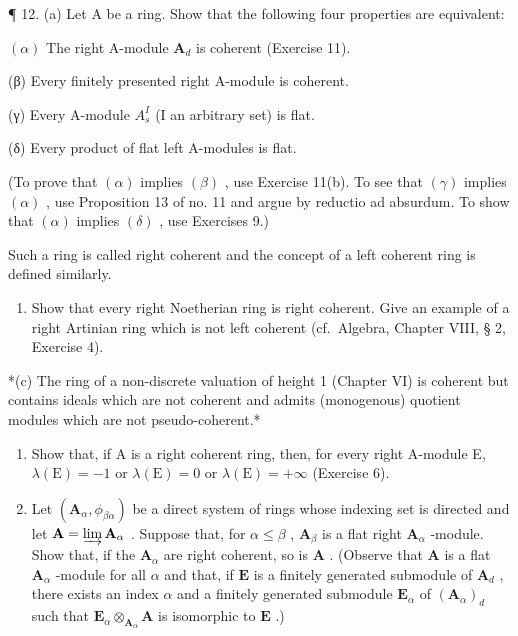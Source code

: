 ¶ 12. (a) Let A be a ring. Show that the following four properties are equivalent:

\((\alpha)\) The right A-module \(\mathbf{A}_d\) is coherent (Exercise 11).

(β) Every finitely presented right A-module is coherent.

(γ) Every A-module \(A_{s}^{I}\) (I an arbitrary set) is flat.

(δ) Every product of flat left A-modules is flat.

(To prove that \((\alpha)\) implies \((\beta)\) , use Exercise 11(b). To see that \((\gamma)\) implies \((\alpha)\) , use Proposition 13 of no. 11 and argue by reductio ad absurdum. To show that \((\alpha)\) implies \((\delta)\) , use Exercises 9.)

Such a ring is called right coherent and the concept of a left coherent ring is defined similarly.

\begin{enumerate}
\def\labelenumi{(\alph{enumi})}
\setcounter{enumi}{1}
\tightlist
\item
  Show that every right Noetherian ring is right coherent. Give an example of a right Artinian ring which is not left coherent (cf.~Algebra, Chapter VIII, § 2, Exercise 4).
\end{enumerate}

*(c) The ring of a non-discrete valuation of height 1 (Chapter VI) is coherent but contains ideals which are not coherent and admits (monogenous) quotient modules which are not pseudo-coherent.*

\begin{enumerate}
\def\labelenumi{(\alph{enumi})}
\setcounter{enumi}{3}
\item
  Show that, if A is a right coherent ring, then, for every right A-module E, \(\lambda(\mathrm{E}) = -1\) or \(\lambda(\mathrm{E}) = 0\) or \(\lambda(\mathrm{E}) = +\infty\) (Exercise 6).
\item
  Let \((\mathbf{A}_{\alpha}, \phi_{\beta \alpha})\) be a direct system of rings whose indexing set is directed and let \(\mathbf{A} = \varinjlim \mathbf{A}_{\alpha}\) . Suppose that, for \(\alpha \leqslant \beta\) , \(\mathbf{A}_{\beta}\) is a flat right \(\mathbf{A}_{\alpha}\) -module. Show that, if the \(\mathbf{A}_{\alpha}\) are right coherent, so is \(\mathbf{A}\) . (Observe that \(\mathbf{A}\) is a flat \(\mathbf{A}_{\alpha}\) -module for all \(\alpha\) and that, if \(\mathbf{E}\) is a finitely generated submodule of \(\mathbf{A}_d\) , there exists an index \(\alpha\) and a finitely generated submodule \(\mathbf{E}_{\alpha}\) of \((\mathbf{A}_{\alpha})_d\) such that \(\mathbf{E}_{\alpha} \otimes_{\mathbf{A}_{\alpha}} \mathbf{A}\) is isomorphic to \(\mathbf{E}\) .)
\end{enumerate}

